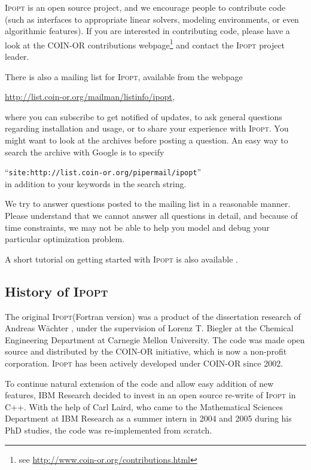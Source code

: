 \documentclass[10pt]{article}
\newcommand{\Ipopt}{\textsc{Ipopt}\xspace}
\begin{document}
\Ipopt is an open source project, and we encourage people to
contribute code (such as interfaces to appropriate linear solvers,
modeling environments, or even algorithmic features).  If you are
interested in contributing code, please have a look at the COIN-OR
contributions webpage\footnote{see \url{http://www.coin-or.org/contributions.html}} and contact the \Ipopt
project leader.

There is also a mailing list for \Ipopt, available from the webpage
\begin{center}
\url{http://list.coin-or.org/mailman/listinfo/ipopt},
\end{center}
where you can subscribe to get notified of updates, to ask general
questions regarding installation and usage, or to share your
experience with \Ipopt. You might want to look at the archives before
posting a question.  An easy way to search the archive with Google is
to specify

``\texttt{site:http://list.coin-or.org/pipermail/ipopt}''\\
in addition to your keywords in the search string.

We try to answer questions posted to the mailing list in a reasonable
manner.  Please understand that we cannot answer all questions in
detail, and because of time constraints, we may not be able to help
you model and debug your particular optimization problem.

A short tutorial on getting started with \Ipopt is also available 
\cite{Waechter90Minutes}.

\subsection{History of \Ipopt}
The original \Ipopt (Fortran version) was a product of the
dissertation research of Andreas W\"achter \cite{WaechterPhD}, under
the supervision of Lorenz T. Biegler at the Chemical Engineering
Department at Carnegie Mellon University. The code was made open
source and distributed by the COIN-OR initiative, which is now a
non-profit corporation.  \Ipopt has been actively developed under
COIN-OR since 2002.

To continue natural extension of the code and allow easy addition of
new features, IBM Research decided to invest in an open source
re-write of \Ipopt in C++.  With the help of Carl Laird, who came to
the Mathematical Sciences Department at IBM Research as a summer
intern in 2004 and 2005 during his PhD studies, the code was
re-implemented from scratch.
\end{document}
